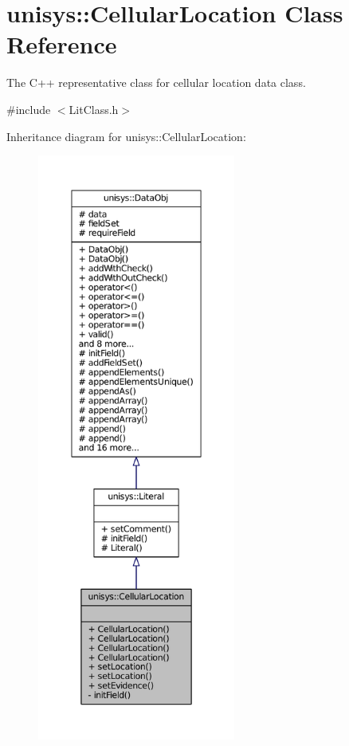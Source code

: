 \hypertarget{classunisys_1_1CellularLocation}{\section{unisys\-:\-:Cellular\-Location Class Reference}
\label{classunisys_1_1CellularLocation}
}


The C++ representative class for cellular location data class.  




{\ttfamily \#include $<$Lit\-Class.\-h$>$}



Inheritance diagram for unisys\-:\-:Cellular\-Location\-:
\nopagebreak
\begin{figure}[H]
\begin{center}
\leavevmode
\includegraphics[height=550pt]{classunisys_1_1CellularLocation__inherit__graph}
\end{center}
\end{figure}


